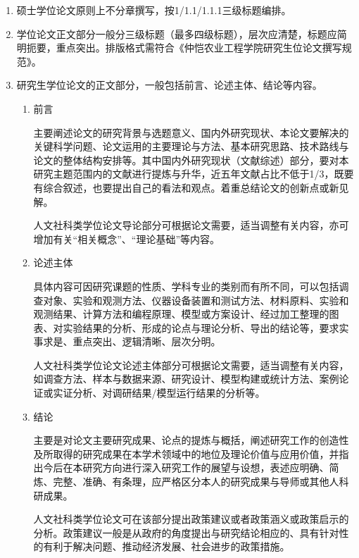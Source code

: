     \begin{enumerate}
        \item 硕士学位论文原则上不分章撰写，按1/1.1/1.1.1三级标题编排。
        \item 学位论文正文部分一般分三级标题（最多四级标题），层次应清楚，标题应简明扼要，重点突出。排版格式需符合《仲恺农业工程学院研究生位论文撰写规范》。
        \item 研究生学位论文的正文部分，一般包括前言、论述主体、结论等内容。
        
          \begin{enumerate}
            \item 前言
            
            主要阐述论文的研究背景与选题意义、国内外研究现状、本论文要解决的关键科学问题、论文运用的主要理论与方法、基本研究思路、技术路线与论文的整体结构安排等。其中国内外研究现状（文献综述）部分，要对本研究主题范围内的文献进行提炼与升华，近五年文献占比不低于1/3，既要有综合叙述，也要提出自己的看法和观点。着重总结论文的创新点或新见解。

            人文社科类学位论文导论部分可根据论文需要，适当调整有关内容，亦可增加有关“相关概念”、“理论基础”等内容。

            \item {论述主体}
            
            具体内容可因研究课题的性质、学科专业的类别而有所不同，可以包括调查对象、实验和观测方法、仪器设备装置和测试方法、材料原料、实验和观测结果、计算方法和编程原理、模型或方案设计、经过加工整理的图表、对实验结果的分析、形成的论点与理论分析、导出的结论等，要求实事求是、重点突出、逻辑清晰、层次分明。

            人文社科类学位论文论述主体部分可根据论文需要，适当调整有关内容，如调查方法、样本与数据来源、研究设计、模型构建或统计方法、案例论证或实证分析、对调研结果/模型运行结果的分析等。
            
            \item {结论}

            主要是对论文主要研究成果、论点的提炼与概括，阐述研究工作的创造性及所取得的研究成果在本学术领域中的地位及理论价值与应用价值，并指出今后在本研究方向进行深入研究工作的展望与设想，表述应明确、简炼、完整、准确、有条理，应严格区分本人的研究成果与导师或其他人科研成果。

            人文社科类学位论文可在该部分提出政策建议或者政策涵义或政策启示的分析。政策建议一般是从政府的角度提出与研究结论相应的、具有针对性的有利于解决问题、推动经济发展、社会进步的政策措施。

          \end{enumerate}

    \end{enumerate}

